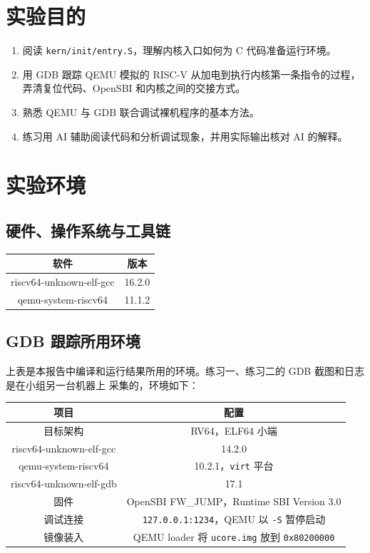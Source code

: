 \documentclass[UTF8,a4paper,10pt,fontset=none]{ctexart}
\begin{document}
\section{实验目的}
\begin{enumerate}
    \item 阅读 \texttt{kern/init/entry.S}，理解内核入口如何为 C 代码准备运行环境。
    \item 用 GDB 跟踪 QEMU 模拟的 RISC-V 从加电到执行内核第一条指令的过程，
          弄清复位代码、OpenSBI 和内核之间的交接方式。
    \item 熟悉 QEMU 与 GDB 联合调试裸机程序的基本方法。
    \item 练习用 AI 辅助阅读代码和分析调试现象，并用实际输出核对 AI 的解释。
\end{enumerate}

\section{实验环境}
\subsection{硬件、操作系统与工具链}
\begin{table}[H]
   \centering
   \begin{tabular}{|c|c|}
        \hline
        软件 & 版本 \\
        \hline
        riscv64-unknown-elf-gcc & 16.2.0 \\
        qemu-system-riscv64 & 11.1.2 \\
        \hline
    \end{tabular}
\end{table}

\subsection{GDB 跟踪所用环境}
上表是本报告中编译和运行结果所用的环境。练习一、练习二的 GDB 截图和日志是在小组另一台机器上
采集的，环境如下：
\begin{table}[H]
    \centering
    \begin{tabular}{|c|c|}
        \hline
        项目 & 配置 \\
        \hline
        目标架构 & RV64，ELF64 小端 \\
        riscv64-unknown-elf-gcc & 14.2.0 \\
        qemu-system-riscv64 & 10.2.1，\texttt{virt} 平台 \\
        riscv64-unknown-elf-gdb & 17.1 \\
        固件 & OpenSBI FW\_JUMP，Runtime SBI Version 3.0 \\
        调试连接 & \texttt{127.0.0.1:1234}，QEMU 以 \texttt{-S} 暂停启动 \\
        镜像装入 & QEMU loader 将 \texttt{ucore.img} 放到 \texttt{0x80200000} \\
        \hline
    \end{tabular}
\end{table}
\end{document}
